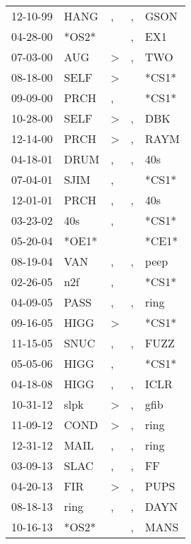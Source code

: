 \begin{supertabular}{lllll}
 12-10-99 &   HANG &             , &             , &   GSON \\
 04-28-00 &  *OS2* &               &             , &    EX1 \\
 07-03-00 &    AUG &  \textgreater &             , &    TWO \\
 08-18-00 &   SELF &  \textgreater &               &  *CS1* \\
 09-09-00 &   PRCH &             , &               &  *CS1* \\
 10-28-00 &   SELF &  \textgreater &             , &    DBK \\
 12-14-00 &   PRCH &  \textgreater &             , &   RAYM \\
 04-18-01 &   DRUM &             , &             , &    40s \\
 07-04-01 &   SJIM &             , &               &  *CS1* \\
 12-01-01 &   PRCH &             , &             , &    40s \\
 03-23-02 &    40s &             , &               &  *CS1* \\
 05-20-04 &  *OE1* &               &               &  *CE1* \\
 08-19-04 &    VAN &             , &             , &   peep \\
 02-26-05 &    n2f &             , &               &  *CS1* \\
 04-09-05 &   PASS &             , &             , &   ring \\
 09-16-05 &   HIGG &  \textgreater &               &  *CS1* \\
 11-15-05 &   SNUC &             , &             , &   FUZZ \\
 05-05-06 &   HIGG &             , &               &  *CS1* \\
 04-18-08 &   HIGG &             , &             , &   ICLR \\
 10-31-12 &   slpk &  \textgreater &             , &   gfib \\
 11-09-12 &   COND &  \textgreater &             , &   ring \\
 12-31-12 &   MAIL &             , &             , &   ring \\
 03-09-13 &   SLAC &             , &             , &     FF \\
 04-20-13 &    FIR &  \textgreater &             , &   PUPS \\
 08-18-13 &   ring &             , &             , &   DAYN \\
 10-16-13 &  *OS2* &               &             , &   MANS \\

\end{supertabular}
